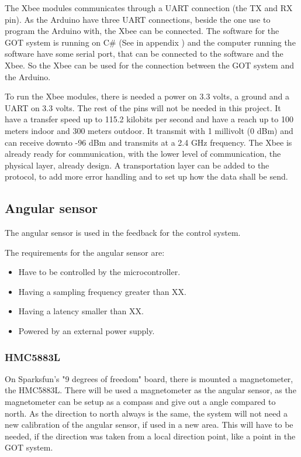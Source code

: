 
The Xbee modules communicates through a UART connection (the TX and RX pin). As the Arduino have three UART connections, beside the one use to program the Arduino with, the Xbee can be connected. The software for the GOT system is running on C\# (See in appendix ) and the computer running the software have some serial port, that can be connected to the software and the Xbee. So the Xbee can be used for the connection between the GOT system and the Arduino.

To run the Xbee modules, there is needed a power on 3.3 volts, a ground and a UART on 3.3 volts. The rest of the pins will not be needed in this project. It have a transfer speed up to 115.2 kilobits per second and have a reach up to 100 meters indoor and 300 meters outdoor. It transmit with 1 millivolt (0 dBm) and can receive downto -96 dBm and transmits at a 2.4 GHz frequency. The Xbee is already ready for communication, with the lower level of communication, the physical layer, already design. A transportation layer can be added to the protocol, to add more error handling and to set up how the data shall be send. 



\subsection{Angular sensor}
The angular sensor is used in the feedback for the control system.

The requirements for the angular sensor are:
\begin{itemize}
\item Have to be controlled by the microcontroller.
\item Having a sampling frequency greater than XX. 
\item Having a latency smaller than XX. 
\item Powered by an external power supply.
\end{itemize}

\subsubsection{HMC5883L}
On Sparksfun's "9 degrees of freedom" board, there is mounted a magnetometer, the HMC5883L. There will be used a magnetometer as the angular sensor, as the magnetometer can be setup as a compass and give out a angle compared to north. As the direction to north always is the same, the system will not need a new calibration of the angular sensor, if used in a new area. This will have to be needed, if the direction was taken from a local direction point, like a point in the GOT system.

